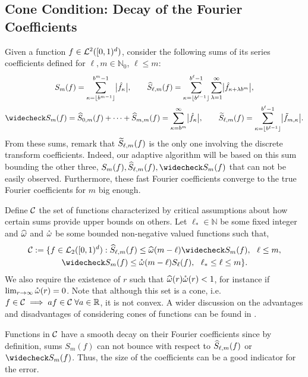\documentclass[graybox]{svmult}
\newcommand{\R}{\mathbb{R}} %
\newcommand{\N}{\mathbb{N}} %
\begin{document}
\subsection{Cone Condition: Decay of the Fourier Coefficients}\label{sumscoeff}
Given a function $f\in\mathcal{L}^2([0,1)^d)$, consider the following sums of its series coefficients defined for $\ell,m \in \N_0$, $\ell \le m$:
\begin{gather*}
S_m(f) =  \sum_{\kappa=\left \lfloor b^{m-1} \right \rfloor}^{b^{m}-1} \bigabs{\hf_{\kappa}}, \qquad 
\hS_{\ell,m}(f)  = \sum_{\kappa=\left \lfloor b^{\ell-1} \right \rfloor}^{b^{\ell}-1} \sum_{\lambda=1}^{\infty} \bigabs{ \hf_{\kappa+\lambda b^{m}}}, \\
\wcS_m(f)=\hS_{0,m}(f) + \cdots + \hS_{m,m}(f)=
\sum_{\kappa=b^{m}}^{\infty} \bigabs{\hf_{\kappa}}, \qquad
\tS_{\ell,m}(f) = \sum_{\kappa=\left \lfloor b^{\ell-1}\right \rfloor}^{b^{\ell}-1} \bigabs{\tf_{m,\kappa}}.
\end{gather*}
From these sums, remark that $\widetilde{S}_{\ell,m}(f)$ is the only one involving the discrete transform coefficients. Indeed, our adaptive algorithm will be based on this sum bounding the other three, $S_m(f),\hS_{\ell,m}(f),\wcS_m(f)$ that can not be easily observed. Furthermore, these fast Fourier coefficients converge to the true Fourier coefficients for $m$ big enough.

Define $\mathcal{C}$ the set of functions characterized by critical assumptions about how certain sums provide upper bounds on others.  Let $\ell_* \in \N$ be some fixed integer and $\widehat{\omega}$ and $\mathring{\omega}$ be some bounded non-negative valued functions such that,
\begin{multline} \label{conecond}
\cc:=\{f \in \cl_2(\cube) : \hS_{\ell,m}(f) \le \homega(m-\ell) \wcS_m(f),\ \ \ell \le m, \\
\wcS_m(f) \le \wcomega(m-\ell) S_{\ell}(f),\ \  \ell_* \le \ell \le m\}.
\end{multline}
We also require the existence of $r$ such that $\widehat{\omega}(r) \mathring{\omega}(r)<1$, for instance if $\lim_{r\rightarrow\infty}\mathring{\omega}(r)=0$. Note that although this set is a cone, i.e. $f \in \cc \implies af \in \cc\;\forall a\in\R$, it is not convex. A wider discussion on the advantages and disadvantages of considering cones of functions can be found in \cite{Clancy201421}.

Functions in $\mathcal{C}$ have a smooth decay on their Fourier coefficients since by definition, sums $S_m(f)$ can not bounce with respect to $\widehat{S}_{\ell,m}(f)$ or $\wcS_m(f)$. Thus, the size of the coefficients can be a good indicator for the error.
\end{document}
